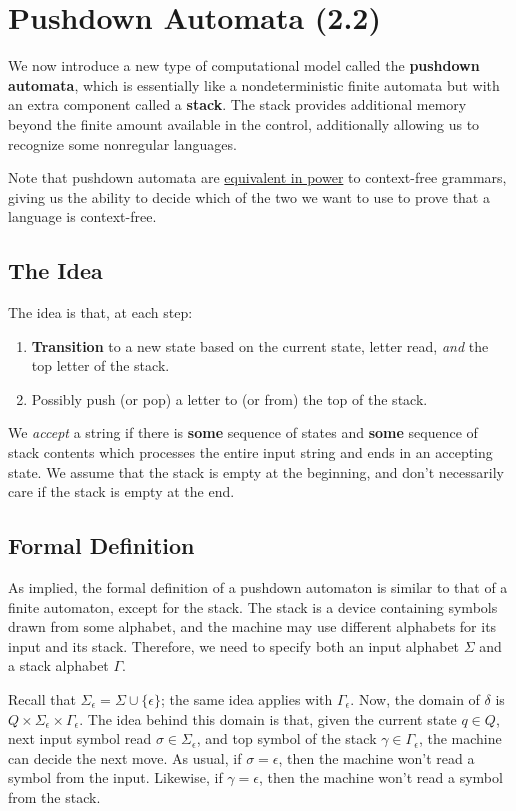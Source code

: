\documentclass[letterpaper]{article}
\begin{document}
\section{Pushdown Automata (2.2)}
We now introduce a new type of computational model called the \textbf{pushdown automata}, which is essentially like a nondeterministic finite automata but with an extra component called a \textbf{stack}. The stack provides additional memory beyond the finite amount available in the control, additionally allowing us to recognize some nonregular languages. 

\bigskip 

Note that pushdown automata are \underline{equivalent in power} to context-free grammars, giving us the ability to decide which of the two we want to use to prove that a language is context-free. 


\subsection{The Idea}
The idea is that, at each step: 
\begin{enumerate}
    \item \textbf{Transition} to a new state based on the current state, letter read, \emph{and} the top letter of the stack. 
    \item Possibly push (or pop) a letter to (or from) the top of the stack. 
\end{enumerate}
We \emph{accept} a string if there is \textbf{some} sequence of states and \textbf{some} sequence of stack contents which processes the entire input string and ends in an accepting state. We assume that the stack is empty at the beginning, and don't necessarily care if the stack is empty at the end.

\subsection{Formal Definition}
As implied, the formal definition of a pushdown automaton is similar to that of a finite automaton, except for the stack. The stack is a device containing symbols drawn from some alphabet, and the machine may use different alphabets for its input and its stack. Therefore, we need to specify both an input alphabet $\Sigma$ and a stack alphabet $\Gamma$. 

\bigskip 

Recall that $\Sigma_{\epsilon} = \Sigma \cup \{\epsilon\}$; the same idea applies with $\Gamma_{\epsilon}$. Now, the domain of $\delta$ is $Q \times \Sigma_{\epsilon} \times \Gamma_{\epsilon}$. The idea behind this domain is that, given the current state $q \in Q$, next input symbol read $\sigma \in \Sigma_{\epsilon}$, and top symbol of the stack $\gamma \in \Gamma_{\epsilon}$, the machine can decide the next move. As usual, if $\sigma = \epsilon$, then the machine won't read a symbol from the input. Likewise, if $\gamma = \epsilon$, then the machine won't read a symbol from the stack.  
\end{document}
